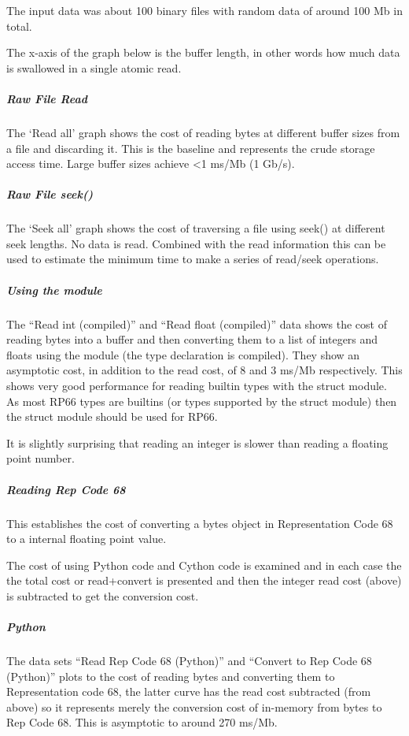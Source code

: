 \documentclass[letterpaper,10pt,english]{sphinxmanual}
\begin{document}
The input data was about 100 binary files with random data of around 100 Mb in total.

The x-axis of the graph below is the buffer length, in other words how much data is swallowed in a single atomic read.

\noindent{}


\subparagraph{Raw File Read}
\label{\detokenize{tech/performance:raw-file-read}}
The ‘Read all’ graph shows the cost of reading bytes at different buffer sizes from a file and discarding it. This is the baseline and represents the crude storage access time. Large buffer sizes achieve \textless{}1 ms/Mb (1 Gb/s).


\subparagraph{Raw File seek()}
\label{\detokenize{tech/performance:raw-file-seek}}
The ‘Seek all’ graph shows the cost of traversing a file using seek() at different seek lengths. No data is read. Combined with the read information this can be used to estimate the minimum time to make a series of read/seek operations.


\subparagraph{Using the  module}
\label{\detokenize{tech/performance:using-the-struct-module}}
The “Read int (compiled)” and “Read float (compiled)” data shows the cost of reading bytes into a buffer and then converting them to a list of integers and floats using the  module (the type declaration is compiled). They show an asymptotic cost, in addition to the read cost, of 8 and 3 ms/Mb respectively. This shows very good performance for reading builtin types with the struct module. As most RP66 types are builtins (or types supported by the struct module) then the struct module should be used for RP66.

It is slightly surprising that reading an integer is slower than reading a floating point number.


\subparagraph{Reading Rep Code 68}
\label{\detokenize{tech/performance:reading-rep-code-68}}
This establishes the cost of converting a bytes object in Representation Code 68 to a internal floating point value.

The cost of using Python code and Cython code is examined and in each case the the total cost or read+convert is presented and then the integer  read cost (above) is subtracted to get the conversion cost.


\subparagraph{Python}
\label{\detokenize{tech/performance:python}}
The data sets “Read Rep Code 68 (Python)” and “Convert to Rep Code 68 (Python)” plots to the cost of reading bytes and converting them to Representation code 68, the latter curve has the read cost subtracted (from above) so it represents merely the conversion cost of in-memory from bytes to Rep Code 68. This is asymptotic to around 270 ms/Mb.
\end{document}
